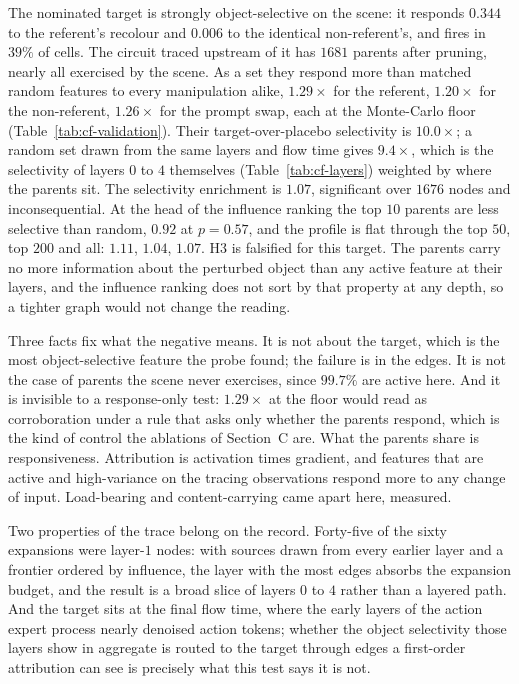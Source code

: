 The nominated target is strongly object-selective on the scene: it responds
$0.344$ to the referent's recolour and $0.006$ to the identical non-referent's,
and fires in $39\%$ of cells. The circuit traced upstream of it has $1681$
parents after pruning, nearly all exercised by the scene. As a set they respond
more than matched random features to every manipulation alike, $1.29\times$
for the referent, $1.20\times$ for the non-referent, $1.26\times$ for the
prompt swap, each at the Monte-Carlo floor (Table~\ref{tab:cf-validation}).
Their target-over-placebo selectivity is $10.0\times$; a random set drawn from
the same layers and flow time gives $9.4\times$, which is the selectivity of
layers $0$ to $4$ themselves (Table~\ref{tab:cf-layers}) weighted by where the
parents sit. The selectivity enrichment is $1.07$, significant over $1676$
nodes and inconsequential. At the head of the influence ranking the top $10$
parents are less selective than random, $0.92$ at $p=0.57$, and the profile is
flat through the top $50$, top $200$ and all: $1.11$, $1.04$, $1.07$. H3 is
falsified for this target. The parents carry no more information about the
perturbed object than any active feature at their layers, and the influence
ranking does not sort by that property at any depth, so a tighter graph would
not change the reading.

Three facts fix what the negative means. It is not about the target, which is
the most object-selective feature the probe found; the failure is in the edges.
It is not the case of parents the scene never exercises, since $99.7\%$ are
active here. And it is invisible to a response-only test: $1.29\times$ at the
floor would read as corroboration under a rule that asks only whether the
parents respond, which is the kind of control the ablations of Section~C are.
What the parents share is responsiveness. Attribution is activation times
gradient, and features that are active and high-variance on the tracing
observations respond more to any change of input. Load-bearing and
content-carrying came apart here, measured.

Two properties of the trace belong on the record. Forty-five of the sixty
expansions were layer-$1$ nodes: with sources drawn from every earlier layer
and a frontier ordered by influence, the layer with the most edges absorbs the
expansion budget, and the result is a broad slice of layers $0$ to $4$ rather
than a layered path. And the target sits at the final flow time, where the
early layers of the action expert process nearly denoised action tokens;
whether the object selectivity those layers show in aggregate is routed to the
target through edges a first-order attribution can see is precisely what this
test says it is not.

